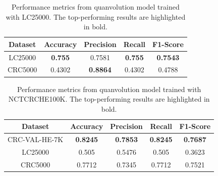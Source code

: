 \begin{table}[t!]
\centering

\caption{Performance metrics from quanvolution model trained with \gls{LC25000}. The top-performing results are highlighted in bold.}
\label{table_quanvolution_lc25000}

\begin{tabular}{|c|c|c|c|c|}
\hline
\textbf{Dataset} & \textbf{Accuracy}          & \textbf{Precision}    & \textbf{Recall}       & \textbf{F1-Score}     \\ \hline
LC25000                               & \textbf{0.755}                & 0.7581               & \textbf{0.755}                 & \textbf{0.7543}           \\ \hline
CRC5000                          & 0.4302                & \textbf{0.8864}                & 0.4302                & 0.4788                \\ \hline
\end{tabular}

\end{table}



\begin{table}[t!]
\centering

\caption{Performance metrics from quanvolution model trained with \gls{NCTCRCHE100K}. The top-performing results are highlighted in bold.}
\label{table_quanvolution_nctcrche100k}

\begin{tabular}{|c|c|c|c|c|}
\hline
\textbf{Dataset} & \textbf{Accuracy}          & \textbf{Precision}    & \textbf{Recall}       & \textbf{F1-Score}     \\ \hline
CRC-VAL-HE-7K                               & \textbf{0.8245}                & \textbf{0.7853}                & \textbf{0.8245}                 & \textbf{0.7687}           \\ \hline
LC25000                          & 0.505                & 0.5476                & 0.505                & 0.3623                \\ \hline
CRC5000                               & 0.7712                & 0.7345                & 0.7712                 & 0.7521           \\ \hline
\end{tabular}

\end{table}



